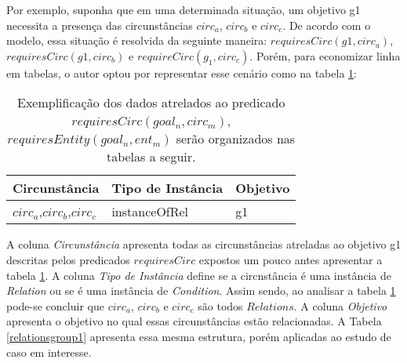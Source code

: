 Por exemplo, suponha que em uma determinada situação, um objetivo g1 necessita a presença das circunstâncias $circ_a$, $circ_b$ e $circ_c$. De acordo com o modelo, essa situação é resolvida da seguinte maneira: $requiresCirc(g1,circ_a)$, $requiresCirc(g1,circ_b)$ e $requireCirc(g_1,circ_c)$. Porém, para economizar linha em tabelas, o autor optou por representar esse cenário como na tabela \ref{tableexemplgroupdataone}:

\begin{table}[H]
\centering
{}
\begin{tabular}{|l|l|l|}
\hline
\textbf{Circunstância}		 	& \textbf{Tipo de Instância}	&	\textbf{Objetivo}	\\ \hline
$circ_a$,$circ_b$,$circ_c$		& instanceOfRel 				& 	 g1         		\\ \hline
\end{tabular}
\caption{Exemplificação dos dados atrelados ao predicado $requiresCirc(goal_n, circ_m)$,$requiresEntity(goal_n, ent_m)$ serão organizados nas tabelas a seguir.}
\label{tableexemplgroupdataone}
\end{table}

A coluna \textit{Circunstância} apresenta todas as circunstâncias atreladas ao objetivo g1 descritas pelos predicados $requiresCirc$ expostos um pouco antes apresentar a tabela \ref{tableexemplgroupdataone}. A coluna \textit{Tipo de Instância} define se a circnstância é uma instância de \textit{Relation} ou se é uma instância de \textit{Condition}. Assim sendo, ao analisar a tabela \ref{tableexemplgroupdataone} pode-se concluir que $circ_a$, $circ_b$ e $circ_c$ são todos $Relations$. A coluna \textit{Objetivo} apresenta o objetivo no qual essas circunstâncias estão relacionadas. A Tabela \ref{relationsgroup1} apresenta essa mesma estrutura, porém aplicadas ao estudo de caso em interesse.

